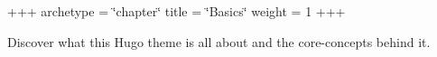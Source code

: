 +++ archetype = \char`\"{}chapter\char`\"{} title = \char`\"{}\+Basics\char`\"{} weight = 1 +++

Discover what this Hugo theme is all about and the core-\/concepts behind it. 
